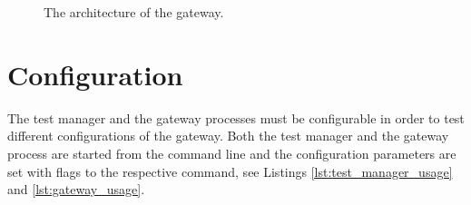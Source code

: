 \begin{figure}[h!]
    \centering
    \caption{The architecture of the gateway.}
    \label{fig:gateway_impl_architecture}
\end{figure}

\section{Configuration}
\label{sec:configuration}

The test manager and the gateway processes must be configurable in order to
test different configurations of the gateway. Both the test manager and the
gateway process are started from the command line and the configuration
parameters are set with flags to the respective command, see Listings
\ref{lst:test_manager_usage} and \ref{lst:gateway_usage}.

